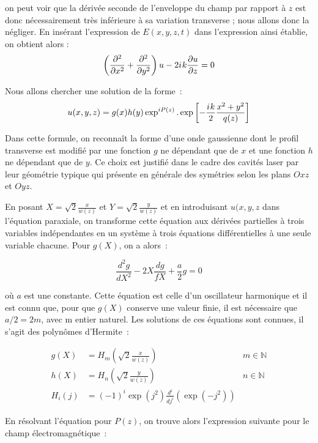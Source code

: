 \documentclass[a4paper]{book}
\newcommand{\iu}{{i\mkern1mu}}
\begin{document}
on peut voir que la dérivée seconde de l'enveloppe du champ par rapport à $z$ est donc nécessairement très inférieure à sa variation transverse ; nous allons donc la négliger. En insérant l'expression de $E(x,y,z,t)$ dans l'expression ainsi établie, on obtient alors : 
\begin{equation}
    \left(\frac{\partial^2}{\partial x^2}+\frac{\partial^2 }{\partial y^2}\right)u-2\iu k \frac{\partial u}{\partial z}=0
\end{equation}

Nous allons chercher une solution de la forme~:
\begin{equation}
    u(x,y,z)=g(x)h(y)\exp^{iP(z)}.\exp\left[-\frac{\iu k }{2}\frac{x^2+y^2}{q(z)}\right]
\end{equation}

Dans cette formule, on reconnaît la forme d'une onde gaussienne dont le profil transverse est modifié par une fonction $g$ ne dépendant que de $x$ et une fonction $h$ ne dépendant que de $y$. Ce choix est justifié dans le cadre des cavités laser par leur géométrie typique qui présente en générale des symétries selon les plans $Oxz$ et $Oyz$.

En posant $X=\sqrt{2}\frac{x}{w(z)}$ et $Y=\sqrt{2}\frac{y}{w(z)}$ et en introduisant $u(x,y,z$ dans l'équation paraxiale, on transforme cette équation aux dérivées partielles à trois variables indépendantes en un système à trois équations différentielles à une seule variable chacune. Pour $g(X)$, on a alors~:

\begin{equation}
    \frac{d^2g}{dX^2}-2X\frac{dg}{fX}+\frac{a}{2}g=0
\end{equation}

où $a$ est une constante. 
Cette équation est celle d'un oscillateur harmonique et il est connu que, pour que $g(X)$ conserve une valeur finie, il est nécessaire que $a/2=2m$, avec m entier naturel. Les solutions de ces équations sont connues, il s'agit des polynômes d'Hermite~:

\begin{align}
    g(X)&=H_m\left(\sqrt{2}\frac{x}{w(z)}\right)\quad&m\in\mathbb{N}\\
    h(X)&=H_n\left(\sqrt{2}\frac{y}{w(z)}\right)\quad&n\in\mathbb{N}\\
    H_i(j)&=(-1)^i\exp(j^2)\frac{d^i}{dj^i}\left(\exp(-j^2)\right)
\end{align}

En résolvant l'équation pour $P(z)$, on trouve alors l'expression suivante pour le champ électromagnétique~:
\end{document}
